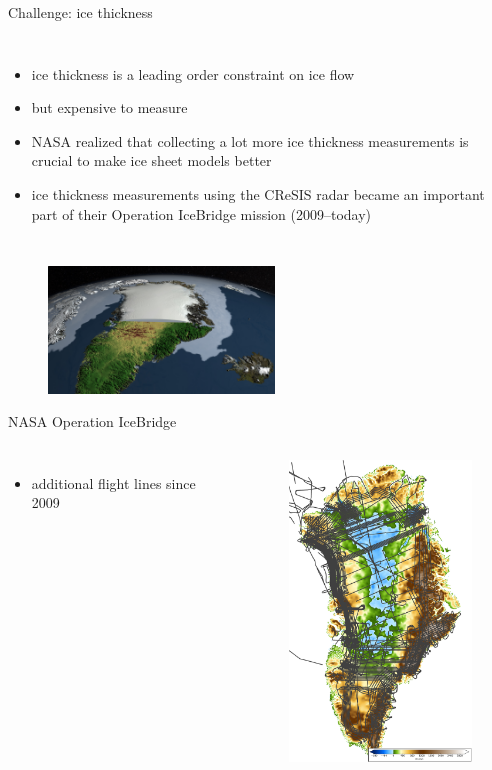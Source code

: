 \documentclass[hide notes,intlimits,unknownkeysallowed]{beamer}
\begin{document}
\begin{frame}{Challenge: ice thickness}
\begin{columns}
    \column[c]{10cm}
    \begin{itemize}
    \item ice thickness is a leading order constraint on ice flow
    \item but expensive to measure
    \item NASA realized that collecting a lot more ice thickness measurements is crucial to make ice sheet models better
    \item ice thickness measurements using the CReSIS radar became an important part of their Operation IceBridge mission (2009--today)
    \end{itemize}
  \end{columns}
  \begin{figure}
    \includegraphics[width=6cm]{canale_grande_V05}
  \end{figure}
\end{frame}


\begin{frame}{NASA Operation IceBridge}
  \vspace{-0.74em}
  \begin{columns}
    \column[c]{4cm}
    \begin{itemize}
    \item additional flight lines since 2009
    \end{itemize}
    \column[c]{6cm}
    \begin{figure}
      \includegraphics[height=8cm]{greenland-bed-old-oib}
    \end{figure}
  \end{columns}
\end{frame}
\end{document}
